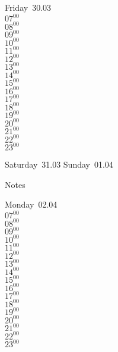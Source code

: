 \documentclass[11pt, a4paper]{book}\usepackage[]{graphicx}\usepackage[]{color}
\begin{document}
\begin{weekdaybox}
  Friday~30.03\\
  { 
  \vfill
  $07^{00}$\\
$08^{00}$\\
$09^{00}$\\
$10^{00}$\\
$11^{00}$\\
$12^{00}$\\
$13^{00}$\\
$14^{00}$\\
$15^{00}$\\
$16^{00}$\\
$17^{00}$\\
$18^{00}$\\
$19^{00}$\\
$20^{00}$\\
$21^{00}$\\
$22^{00}$\\
$23^{00}$\\
  }
\end{weekdaybox}
\begin{weekendbox}
  Saturday~31.03
  \tcblower
  Sunday~01.04
\end{weekendbox} %
\begin{notebox}
  Notes
\end{notebox}
\clearpage
\begin{headerbox}
\end{headerbox}
\begin{weekdaybox}
  Monday~02.04\\
  { 
  \vfill
  $07^{00}$\\
$08^{00}$\\
$09^{00}$\\
$10^{00}$\\
$11^{00}$\\
$12^{00}$\\
$13^{00}$\\
$14^{00}$\\
$15^{00}$\\
$16^{00}$\\
$17^{00}$\\
$18^{00}$\\
$19^{00}$\\
$20^{00}$\\
$21^{00}$\\
$22^{00}$\\
$23^{00}$\\
  }
\end{weekdaybox}
\end{document}
